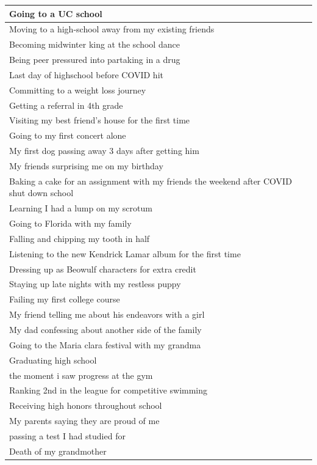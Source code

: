\documentclass[
  .7em,
  letterpaper,
  DIV=11,
  numbers=noendperiod]{scrartcl}
\begin{document}
\begin{table}
\begin{tabular}{l}
\hline
Going to a UC school\\
\hline
Moving to a high-school away from my existing friends\\
\hline
Becoming midwinter king at the school dance\\
\hline
Being peer pressured into partaking in a drug\\
\hline
Last day of highschool before COVID hit\\
\hline
Committing to a weight loss journey\\
\hline
Getting a referral in 4th grade\\
\hline
Visiting my best friend's house for the first time\\
\hline
Going to my first concert alone\\
\hline
My first dog passing away 3 days after getting him\\
\hline
My friends surprising me on my birthday\\
\hline
Baking a cake for an assignment with my friends the weekend after COVID shut down school\\
\hline
Learning I had a lump on my scrotum\\
\hline
Going to Florida with my family\\
\hline
Falling and chipping my tooth in half\\
\hline
Listening to the new Kendrick Lamar album for the first time\\
\hline
Dressing up as Beowulf characters for extra credit\\
\hline
Staying up late nights with my restless puppy\\
\hline
Failing my first college course\\
\hline
My friend telling me about his endeavors with a girl\\
\hline
My dad confessing about another side of the family\\
\hline
Going to the Maria clara festival with my grandma\\
\hline
Graduating high school\\
\hline
the moment i saw progress at the gym\\
\hline
Ranking 2nd in the league for competitive swimming\\
\hline
Receiving high honors throughout school\\
\hline
My parents saying they are proud of me\\
\hline
passing a test I had studied for\\
\hline
Death of my grandmother\\

\end{tabular}
\end{table}
\end{document}
